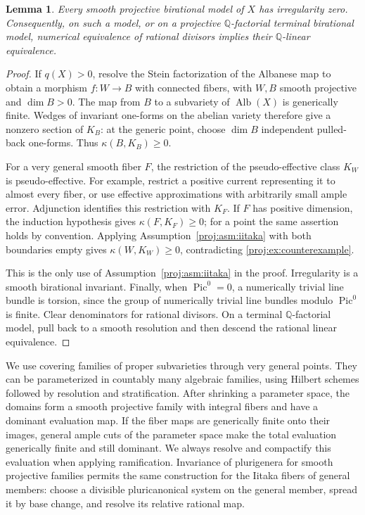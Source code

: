 \documentclass[11pt,letterpaper]{article}
\newtheorem{lemma}[theorem]{Lemma}
\theoremstyle{definition}
\theoremstyle{remark}
\begin{document}
\begin{lemma}\label{proj:ex:irregularity}
Every smooth projective birational model of \(X\) has irregularity zero.
Consequently, on such a model, or on a projective \(\mathbb{Q}\)-factorial
terminal birational model, numerical equivalence of rational divisors
implies their \(\mathbb{Q}\)-linear equivalence.
\end{lemma}
\begin{proof}
If \(q(X)>0\), resolve the Stein factorization of the Albanese map to
obtain a morphism \(f:W\to B\) with connected fibers, with \(W,B\)
smooth projective and \(\dim B>0\). The map from \(B\) to a subvariety
of \(\operatorname{Alb}(X)\) is generically finite. Wedges of invariant one-forms
on the abelian variety therefore give a nonzero section of \(K_B\):
at the generic point, choose \(\dim B\) independent pulled-back
one-forms. Thus \(\kappa(B,K_B)\geq0\).

For a very general smooth fiber \(F\), the restriction of the
pseudo-effective class \(K_W\) is pseudo-effective. For example, restrict
a positive current representing it to almost every fiber, or use
effective approximations with arbitrarily small ample error.
Adjunction identifies this restriction with \(K_F\). If \(F\) has
positive dimension, the induction hypothesis gives
\(\kappa(F,K_F)\geq0\); for a point the same assertion holds by
convention. Applying Assumption~\ref{proj:asm:iitaka} with both boundaries
empty gives \(\kappa(W,K_W)\geq0\), contradicting
\eqref{proj:ex:counterexample}.

This is the only use of Assumption~\ref{proj:asm:iitaka} in the proof.
Irregularity is a smooth birational invariant. Finally, when
\(\operatorname{Pic}^0=0\), a numerically trivial line bundle is torsion, since the
group of numerically trivial line bundles modulo \(\operatorname{Pic}^0\) is
finite. Clear denominators for rational divisors. On a terminal
\(\mathbb{Q}\)-factorial model, pull back to a smooth resolution and then
descend the rational linear equivalence.
\end{proof}

We use covering families of proper subvarieties through very general
points. They can be parameterized in countably many algebraic
families, using Hilbert schemes followed by resolution and
stratification. After shrinking a parameter space, the domains form
a smooth projective family with integral fibers and have a dominant
evaluation map. If the fiber maps are generically finite onto their
images, general ample cuts of the parameter space make the total
evaluation generically finite and still dominant. We always resolve
and compactify this evaluation when applying ramification.
Invariance of plurigenera for smooth projective families
\cite[Theorem~1]{Proj-Paun2007} permits the same construction for the
Iitaka fibers of general members: choose a divisible pluricanonical
system on the general member, spread it by base change, and resolve
its relative rational map.
\end{document}
